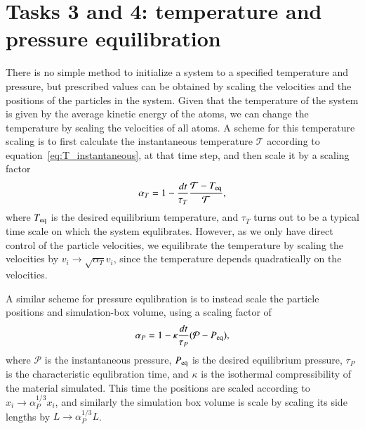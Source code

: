 \section*{Tasks 3 and 4: temperature and pressure equilibration}
There is no simple method to initialize a system to a specified temperature and pressure, but prescribed values can be obtained by scaling the velocities and the positions of the particles in the system. 
Given that the temperature of the system is given by the average kinetic energy of the atoms, we can change the temperature by scaling the velocities of all atoms. A scheme for this temperature scaling is to first calculate the instantaneous temperature $\mathcal{T}$ according to equation~\eqref{eq:T_instantaneous}, at that time step, and then scale it by a scaling factor
\begin{equation}
\alpha_T=1-\frac{dt}{\tau_T}\frac{\mathcal{T}-T_{\rm eq}}{\mathcal{T}},
\end{equation}
where $T_{\rm eq}$ is the desired equilibrium temperature, and $\tau_T$ turns out to be a typical time scale on which the system equlibrates. However, as we only have direct control of the particle velocities, we equilibrate the temperature by scaling the velocities by $v_i\to\sqrt{\alpha_T}v_i$, since the temperature depends quadratically on the velocities.

A similar scheme for pressure equlibration is to instead scale the particle positions and simulation-box volume, using a scaling factor of
\begin{equation}
\alpha_P=1-\kappa\frac{dt}{\tau_P}(\mathcal{P}-P_{\rm eq}),
\end{equation}
where $\mathcal{P}$ is the instantaneous pressure, $P_{\rm eq}$ is the desired equilibrium pressure, $\tau_P$ is the characteristic equlibration time, and $\kappa$ is the isothermal compressibility of the material simulated\footnotemark{}. This time the positions are scaled according to $x_i\to\alpha_P^{1/3}x_i$, and similarly the simulation box volume is scale by scaling its side lengths by $L\to\alpha_P^{1/3}L$.

